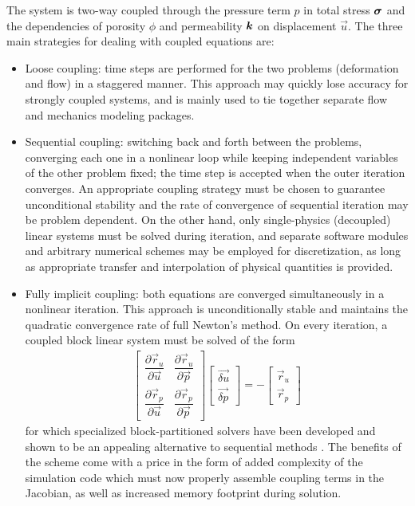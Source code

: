 The system  is two-way coupled through the pressure term $p$ in total stress $\bm{\sigma}$ and the dependencies of porosity $\phi$ and permeability $\bm{k}$ on displacement $\vec{u}$.   The three main strategies for dealing with coupled equations are:
\begin{itemize}
    \item Loose coupling: time steps are performed for the two problems (deformation and flow) in a staggered manner.   This approach may quickly lose accuracy for strongly coupled systems, and is mainly used to tie together separate flow and mechanics modeling packages. 
    \item Sequential coupling: switching back and forth between the problems, converging each one in a nonlinear loop while keeping independent variables of the other problem fixed; the time step is accepted when the outer iteration converges.   An appropriate coupling strategy must be chosen to guarantee unconditional stability \cite{Kim2011a,Kim2011b,Castelletto2015} and the rate of convergence of sequential iteration may be problem dependent.   On the other hand, only single-physics (decoupled) linear systems must be solved during iteration, and separate software modules and arbitrary numerical schemes may be employed for discretization, as long as appropriate transfer and interpolation of physical quantities is provided.
    \item Fully implicit coupling: both equations are converged simultaneously in a nonlinear iteration.   This approach is unconditionally stable and maintains the quadratic convergence rate of full Newton's method.   On every iteration, a coupled block linear system must be solved of the form
    \begin{align}
        \begin{bmatrix}
        \dfrac{\partial \vec{r}_u}{\partial \vec{u}} & \dfrac{\partial \vec{r}_u}{\partial \vec{p}} \\
        \dfrac{\partial \vec{r}_p}{\partial \vec{u}} & \dfrac{\partial \vec{r}_p}{\partial \vec{p}}
        \end{bmatrix}
        \begin{bmatrix}
            \vec{\delta u} \\
            \vec{\delta p}
        \end{bmatrix} = -
        \begin{bmatrix}
            \vec{r}_u \\
            \vec{r}_p
        \end{bmatrix}
    \end{align}
    for which specialized block-partitioned solvers have been developed and shown to be an appealing alternative to sequential methods \cite{White2015,White2019}.   The benefits of the scheme come with a price in the form of added complexity of the simulation code which must now properly assemble coupling terms in the Jacobian, as well as increased memory footprint during solution.
\end{itemize}

